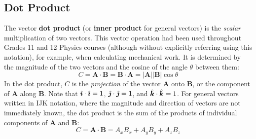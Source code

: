 \documentclass{../../oss-handout}
\newcommand{\iii}{\ensuremath\hat{\bm\imath}}
\newcommand{\jjj}{\ensuremath\hat{\bm\jmath}}
\newcommand{\kkk}{\ensuremath\hat{\bm k}}
\begin{document}
\subsection{Dot Product}
The vector \textbf{dot product} (or \textbf{inner product} for general vectors)
is the \emph{scalar} multiplication of two vectors. This vector operation had
been used throughout Grades 11 and 12 Physics courses (although without
explicitly referring using this notation), for example, when calculating
mechanical work. It is determined by the magnitude of the two vectors and the
cosine of the angle $\theta$ between them:
\begin{equation*}
  C=\bm A\cdot\bm B=\bm B\cdot\bm A=|\bm A||\bm B|\cos\theta
\end{equation*}
In the dot product, $C$ is the \emph{projection} of the vector $\bm A$ onto
$\bm B$, or the component of $\bm A$ along $\bm B$. Note that
$\iii\cdot\iii=1$, $\jjj\cdot\jjj=1$, and $\kkk\cdot\kkk=1$. For general
vectors written in IJK notation, where the magnitude and direction of vectors
are not immediately known, the dot product is the sum of the products of
individual components of $\bm A$ and $\bm B$:
\begin{equation*}
  C=\bm A\cdot\bm B=A_xB_x+A_yB_y+A_zB_z
\end{equation*}
\end{document}
